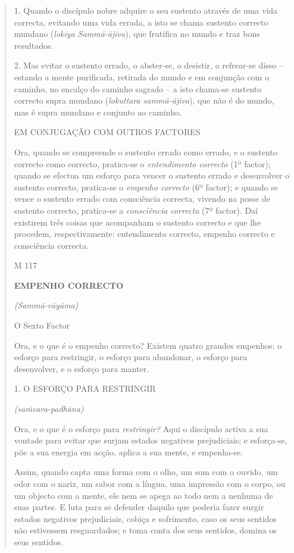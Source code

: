 \begin{quote}
1. Quando o discípulo nobre adquire o seu sustento através de uma vida correcta, evitando uma vida errada, a isto se chama sustento correcto mundano (\emph{lokiya Sammā-ājiva}), que frutifica no mundo e traz bons resultados.

2. Mas evitar o sustento errado, o abster-se, o desistir, o refrear-se disso -- estando a mente purificada, retirada do mundo e em conjunção com o caminho, no encalço do caminho sagrado -- a isto chama-se sustento correcto supra mundano (\emph{lokuttara sammā-ājiva}), que não é do mundo, mas é supra mundano e conjunto ao caminho.

EM CONJUGAÇÃO COM OUTROS FACTORES

Ora, quando se compreende o sustento errado como errado, e o sustento correcto como correcto, pratica-se o \emph{entendimento correcto} (1º factor); quando se efectua um esforço para vencer o sustento errado e desenvolver o sustento correcto, pratica-se o \emph{empenho correcto} (6º factor); e quando se vence o sustento errado com consciência correcta, vivendo na posse de sustento correcto, pratica-se a \emph{consciência correcta} (7º factor). Daí existirem três coisas que acompanham o sustento correcto e que lhe procedem, respectivamente: entendimento correcto, empenho correcto e consciência correcta.

M 117

\textbf{EMPENHO CORRECTO}

\emph{(Sammā-vāyāma)}

O Sexto Factor

Ora, e o que é o empenho correcto? Existem quatro grandes empenhos: o esforço para restringir, o esforço para abandonar, o esforço para desenvolver, e o esforço para manter.

1. O ESFORÇO PARA RESTRINGIR

\emph{(saṁvara-padhāna)}

Ora, e o que é o esforço para \emph{restringir?} Aqui o discípulo activa a sua vontade para evitar que surjam estados negativos prejudiciais; e esforça-se, põe a sua energia em acção, aplica a sua mente, e empenha-se.

Assim, quando capta uma forma com o olho, um som com o ouvido, um odor com o nariz, um sabor com a língua, uma impressão com o corpo, ou um objecto com a mente, ele nem se apega ao todo nem a nenhuma de suas partes. E luta para se defender daquilo que poderia fazer surgir estados negativos prejudiciais, cobiça e sofrimento, caso os seus sentidos não estivessem resguardados; e toma conta dos seus sentidos, domina os seus sentidos.


\end{quote}

